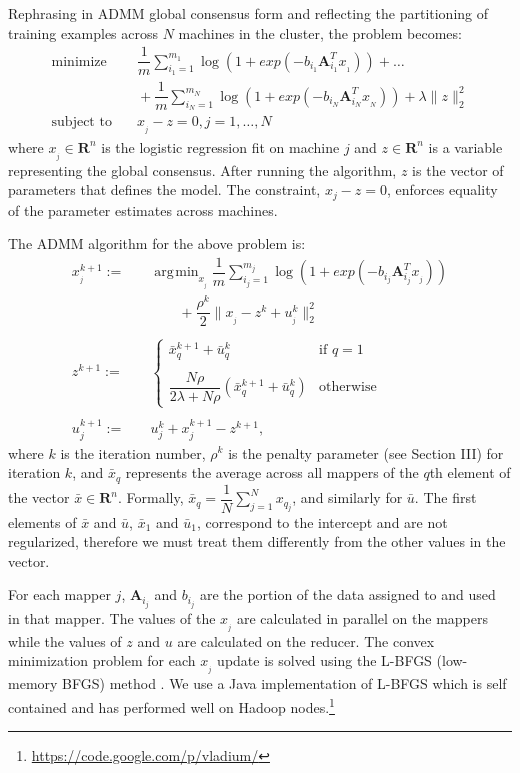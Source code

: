 \documentclass[10pt, conference, compsocconf]{IEEEtran}
\DeclareMathOperator*{\argmin}{arg\!\min}
\begin{document}
Rephrasing in ADMM global consensus form and reflecting the partitioning of training examples across $N$ machines in the cluster, the problem becomes:
\begin{align*}
\text{minimize}&\quad \dfrac{1}{m}\sum_{i_1=1}^{m_1} \log(1 + exp(-b_{i_1}\mathbf{A}_{i_1}^Tx_{_1}))+\ldots \\
&\quad+\dfrac{1}{m}\sum_{i_N=1}^{m_N} \log(1 + exp(-b_{i_N}\mathbf{A}_{i_N}^Tx_{_N}))+\lambda\|z\|_2^2\\
\text{subject to}&\quad x_{_j} - z = 0, j = 1, \ldots, N
\end{align*}
where $x_{_j}\in\mathbf{R}^n$ is the logistic regression fit on machine $j$ and $z\in\mathbf{R}^n$ is a variable representing the global consensus.  After running the algorithm, $z$ is the vector of parameters that defines the model. The constraint, $x_j-z=0$, enforces equality of the parameter estimates across machines.

The ADMM algorithm for the above problem is:
\begin{align}
\label{eq:x}
x_{_j}^{k+1} :=&\quad \argmin_{x_{_j}} \dfrac{1}{m}\sum_{i_j=1}^{m_j} \log(1 + exp(-b_{i_j}\mathbf{A}_{i_j}^Tx_{_j})) \\
&\quad\quad\quad+ \dfrac{\rho^k}{2}\|x_{_j} - z^k + u_{_j}^k\|_2^2 \nonumber\\
\nonumber\\
\label{eq:z}
z^{k+1} :=&\quad \begin{cases}
    \bar{x}_q^{k+1} + \bar{u}_q^k& \text{if $q=1$}\\
    \\
    \dfrac{N\rho}{2\lambda + N\rho}(\bar{x}_q^{k+1} + \bar{u}_q^k)& \text{otherwise}
  \end{cases}\\
\nonumber\\
\label{eq:u}
u_j^{k+1} :=&\quad u_j^k + x_j^{k+1} - z^{k+1},
\end{align}
where $k$ is the iteration number, $\rho^k$ is the penalty parameter (see Section III) for iteration $k$, and $\bar{x}_q$ represents the average across all mappers of the $q$th element of the vector $\bar{x}\in\mathbf{R}^n$.  Formally, $\bar{x}_q = \dfrac{1}{N}\sum_{j=1}^N x_{q_j}$, and similarly for $\bar{u}$.  The first elements of $\bar{x}$ and $\bar{u}$, $\bar{x}_1$ and $\bar{u}_1$, correspond to the intercept and are not regularized, therefore we must treat them differently from the other values in the vector.

For each mapper $j$, $\mathbf{A}_{i_j}$ and $b_{i_j}$ are the portion of the data assigned to and used in that mapper.  The values of the $x_{_j}$ are calculated in parallel on the mappers while the values of $z$ and $u$ are calculated on the reducer.  The convex minimization problem for each $x_{_j}$ update is solved using the L-BFGS (low-memory BFGS) method \cite{bonnans2003numerical}.  We use a Java implementation of L-BFGS which is self contained and has performed well on Hadoop nodes.\footnote{\url{https://code.google.com/p/vladium/}}
\end{document}
